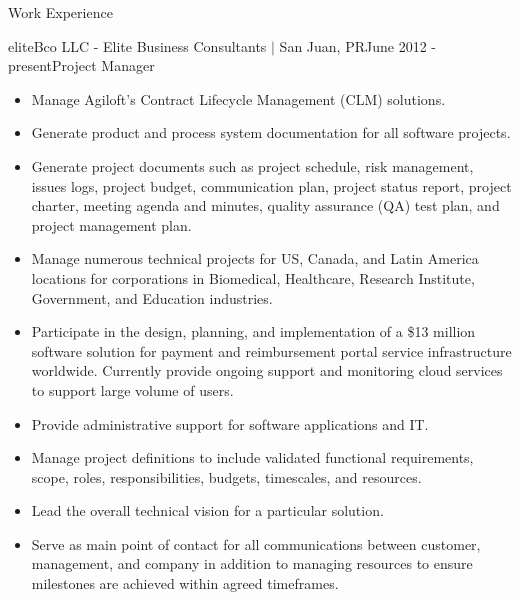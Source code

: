 \documentclass{resume} %
\newcommand{\sectionspace}{\vspace{3mm}}
\begin{document}

\begin{rSection}{Work Experience}

\begin{rSubsection}{eliteBco LLC - Elite
    Business Consultants $\vert$ San Juan, PR}{June 2012 - present}{Project
    Manager}{\space}

\item
\begin{itemize}
\item Manage Agiloft's Contract Lifecycle Management (CLM) solutions.

\item Generate product and process system documentation for all software
  projects.

\item Generate project documents such as project schedule, risk management,
  issues logs, project budget, communication plan, project status report,
  project charter, meeting agenda and minutes, quality assurance (QA) test
  plan, and project management plan.

\item Manage numerous technical projects for US, Canada, and Latin America
  locations for corporations in Biomedical, Healthcare, Research Institute,
  Government, and Education industries.

\item Participate in the design, planning, and implementation of a \$13 million
  software solution for payment and reimbursement portal service infrastructure
  worldwide. Currently provide ongoing support and monitoring cloud services to
  support large volume of users.

\item Provide administrative support for software applications and IT.

\item Manage project definitions to include validated functional requirements,
  scope, roles, responsibilities, budgets, timescales, and resources.

\item Lead the overall technical vision for a particular solution.

\item Serve as main point of contact for all communications between customer,
  management, and company in addition to managing resources to ensure milestones
  are achieved within agreed timeframes.


\end{itemize}
\end{rSubsection}
\end{rSection}
\end{document}
